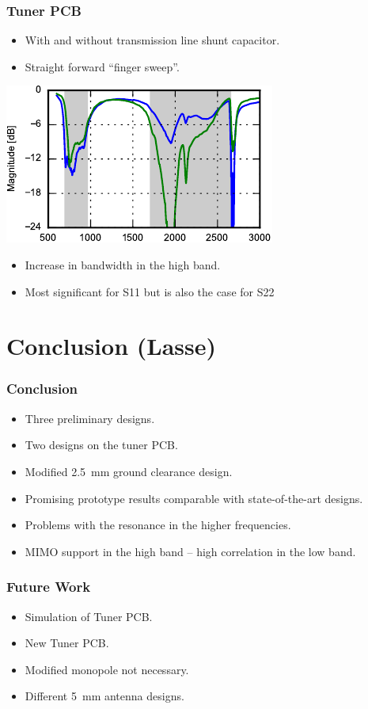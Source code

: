 \begin{frame}
  \frametitle{Tuner PCB}
  \begin{itemize}
  \item With and without transmission line shunt capacitor.
  \item Straight forward ``finger sweep''.
  \end{itemize}
\begin{center}
    \includegraphics[scale=1.4]{img/Lasse/tuner_pcb/003_s11top.pdf}
\end{center}
\begin{itemize}
\item Increase in bandwidth in the high band.
\item Most significant for S11 but is also the case for S22 
\end{itemize}
\legendfooter
\end{frame}

\section[Conclusion]{Conclusion (Lasse)}
\begin{frame}
  \frametitle{Conclusion}
      \begin{itemize}
      \item Three preliminary designs.
      \item Two designs on the tuner PCB.
      \item Modified \SI{2.5}{mm} ground clearance design.
    \item Promising prototype results comparable with state-of-the-art designs.
    \item Problems with the resonance in the higher frequencies.
    \item MIMO support in the high band -- high correlation in the low band.
      \end{itemize}
\end{frame}

\begin{frame}
  \frametitle{Future Work}
      \begin{itemize}
      \item Simulation of Tuner PCB.
      \item New Tuner PCB.
      \item Modified monopole not necessary. 
      \item Different \SI{5}{mm} antenna designs.
      \end{itemize}
\end{frame}

